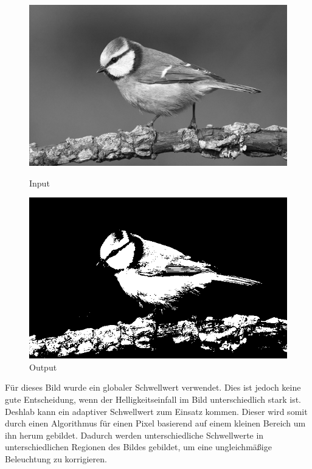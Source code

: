 \begin{figure}[htb]
  \centering
  \begin{minipage}[t]{0.45\linewidth}
    \centering
    \includegraphics[width=\linewidth]{pics/bildverarbeitungsalgos/grayscaling_output.png}
    \caption{Input}
    \label{maai:thresholding:input:second}
  \end{minipage}
  \hfill
  \begin{minipage}[t]{0.45\linewidth}
    \centering
    \includegraphics[width=\linewidth]{pics/bildverarbeitungsalgos/thresholding_output.png}
    \caption{Output}
    \label{maai:thresholding:output}
  \end{minipage}
\end{figure}


Für dieses Bild wurde ein globaler Schwellwert verwendet. Dies ist jedoch keine gute Entscheidung, wenn der Helligkeitseinfall im Bild unterschiedlich stark ist. Deshlab kann ein adaptiver Schwellwert zum Einsatz kommen. Dieser wird somit durch einen Algorithmus für einen Pixel basierend auf einem kleinen Bereich um ihn herum gebildet. Dadurch werden unterschiedliche Schwellwerte in unterschiedlichen Regionen des Bildes gebildet, um eine ungleichmäßige Beleuchtung zu korrigieren.

